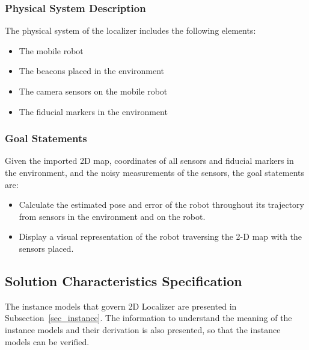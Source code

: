 \documentclass[12pt]{article}
\newcounter{goalnum} %
\begin{document}
\subsubsection{Physical System Description}\label{sec_phySystDescrip}

The physical system of the localizer includes the following elements:

\begin{itemize}

\item[PS1:] The mobile robot

\item[PS2:] The beacons placed in the environment

\item[PS3:] The camera sensors on the mobile robot

\item[PS4:] The fiducial markers in the environment

\end{itemize}

\subsubsection{Goal Statements}

\noindent Given the imported 2D map, coordinates of all sensors and fiducial markers in the environment, and the noisy measurements of the sensors, the goal statements are:

\begin{itemize}

\item[GS\refstepcounter{goalnum}1\label{GS1}:] Calculate the estimated pose and error of the robot throughout its trajectory from sensors in the environment and on the robot.
\item[GS\refstepcounter{goalnum}2\label{GS2}:] Display a visual representation of the robot traversing the 2-D map with the sensors placed.

\end{itemize}

\subsection{Solution Characteristics Specification}

The instance models that govern 2D Localizer are presented in
Subsection~\ref{sec_instance}.  The information to understand the meaning of the
instance models and their derivation is also presented, so that the instance
models can be verified.
\end{document}

